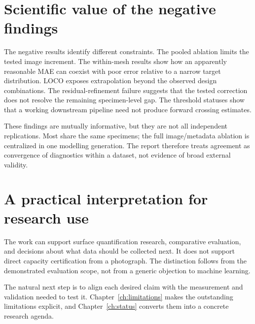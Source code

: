 \section{Scientific value of the negative findings}
The negative results identify different constraints. The pooled ablation limits the tested image increment. The within-mesh results show how an apparently reasonable MAE can coexist with poor error relative to a narrow target distribution. LOCO exposes extrapolation beyond the observed design combinations. The residual-refinement failure suggests that the tested correction does not resolve the remaining specimen-level gap. The threshold statuses show that a working downstream pipeline need not produce forward crossing estimates.

These findings are mutually informative, but they are not all independent replications. Most share the same specimens; the full image/metadata ablation is centralized in one modelling generation. The report therefore treats agreement as convergence of diagnostics within a dataset, not evidence of broad external validity.

\section{A practical interpretation for research use}
The work can support surface quantification research, comparative evaluation, and decisions about what data should be collected next. It does not support direct capacity certification from a photograph. The distinction follows from the demonstrated evaluation scope, not from a generic objection to machine learning.

The natural next step is to align each desired claim with the measurement and validation needed to test it. Chapter~\ref{ch:limitations} makes the outstanding limitations explicit, and Chapter~\ref{ch:status} converts them into a concrete research agenda.
